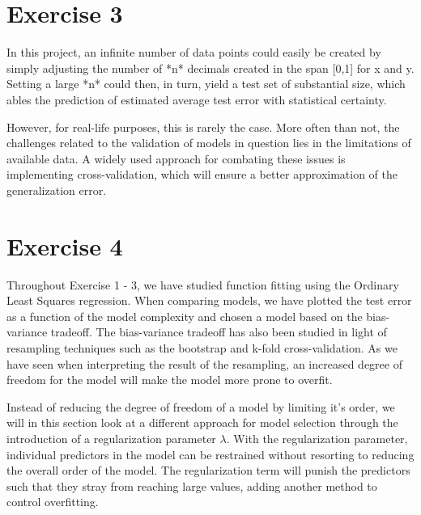 \documentclass[11pt, a4paper]{article}
\begin{document}



\section*{Exercise 3}
In this project, an infinite number of data points could easily be created by simply adjusting the number of *n* decimals created in the span [0,1] for x and y. Setting a large *n* could then, in turn, yield a test set of substantial size, which ables the prediction of estimated average test error with statistical certainty. 

However, for real-life purposes, this is rarely the case. More often than not, the challenges related to the validation of models in question lies in the limitations of available data.  A widely used approach for combating these issues is implementing cross-validation, which will ensure a better approximation of the generalization error. 



\section*{Exercise 4}
Throughout Exercise 1 - 3, we have studied function fitting using the Ordinary Least Squares regression. When comparing models, we have plotted the test error as a function of the model complexity and chosen a model based on the bias-variance tradeoff. The bias-variance tradeoff has also been studied in light of resampling techniques such as the bootstrap and k-fold cross-validation. As we have seen when interpreting the result of the resampling, an increased degree of freedom for the model will make the model more prone to overfit.

Instead of reducing the degree of freedom of a model by limiting it's order, we will in this section look at a different approach for model selection through the introduction of a regularization parameter $\lambda$. With the regularization parameter, individual predictors in the model can be restrained without resorting to reducing the overall order of the model. The regularization term will punish the predictors such that they stray from reaching large values, adding another method to control overfitting. \cite{Bishop2016}
\end{document}
